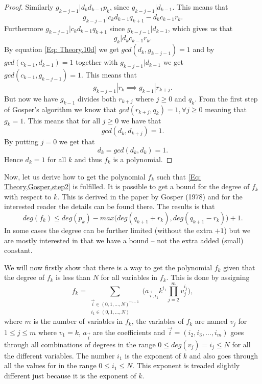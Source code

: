 \begin{proof}
  Similarly $g_{k-j-1}|d_kd_{k-1}p_k$, since $g_{k-j-1}|d_{k-1}$. This means that
  \begin{equation}
    g_{k-j-1}|c_kd_{k-1}q_{k+1}-d_kc_{k-1}r_k.
  \end{equation}
  Furthermore $g_{k-j-1}|c_kd_{k-1}q_{k+1}$ since $g_{k-j-1}|d_{k-1}$, which gives us that
  \begin{equation}
    g_k|d_kc_{k-1}r_k.
  \end{equation}
  By equation \eqref{Eq: Theory,10d} we get $gcd(d_k,g_{k-j-1})=1$ and by $gcd(c_{k-1},d_{k-1})=1$ together with $g_{k-j-1}|d_{k-1}$ we get $gcd(c_{k-1},g_{k-j-1})=1$. This means that
  \begin{equation}
    g_{k-j-1}|r_k \implies g_{k-1}|r_{k+j}.
  \end{equation}
  But now we have $g_{k-1}$ divides both $r_{k+j}$ where $j\geq 0$ and $q_k$. From the first step of Gosper's algorithm we know that $gcd(r_{k+j},q_k)=1, \forall j\geq 0$ meaning that $g_k=1$. This means that for all $j\geq 0$ we have that
  \begin{equation}
    gcd(d_k,d_{k+j})=1.
  \end{equation}
  By putting $j=0$ we get that
  \begin{equation}
    d_k = gcd(d_k,d_k) = 1.
  \end{equation}
  Hence $d_k=1$ for all $k$ and thus $f_k$ is a polynomial.
\end{proof}

Now, let us derive how to get the polynomial $f_k$ such that \eqref{Eq: Theory,Gosper,step2} is fulfilled. It is possible to get a bound for the degree of $f_k$ with respect to $k$. This is derived in the paper by Gosper (1978) and for the interested reader the details can be found there. The results is that
\begin{equation}
  deg(f_k)\leq deg(p_k) - max\big(deg(q_{k+1}+r_k),deg(q_{k+1}-r_k)\big) + 1.
\end{equation}
In some cases the degree can be further limited (without the extra $+1$) but we are mostly interested in that we have a bound -- not the extra added (small) constant.

We will now firstly show that there is a way to get the polynomial $f_k$ given that the degree of $f_k$ is less than $N$ for all variables in $f_k$. This is done by assigning
\begin{equation}\label{Eq: Theory,general polynomial}
  f_k = \sum_{\substack{\vec{i}\in (0,1,\ldots,N)^{m-1}\\i_1\in (0,1,\ldots,N)}} \Big(a_{\vec{i},i_1}k^{i_1}\prod_{j=2}^m v_j^{i_j}\Big),
\end{equation}
where $m$ is the number of variables in $f_k$, the variables of $f_k$ are named $v_j$ for $1\leq j\leq m$ where $v_1=k$, $a_\vec{i}$ are the coefficients and $\vec{i}=(i_2,i_3,\ldots,i_m)$ goes through all combinations of degrees in the range $0\leq deg(v_j)=i_j\leq N$ for all the different variables. The number $i_1$ is the exponent of $k$ and also goes through all the values for in the range $0\leq i_1\leq N$. This exponent is treaded slightly different just because it is the exponent of $k$.

